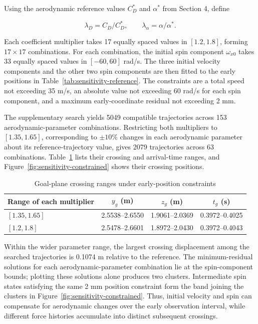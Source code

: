 \documentclass[12pt,letterpaper]{article}
\begin{document}
Using the aerodynamic reference values $C_D^*$ and $\alpha^*$ from Section 4, define


\begin{equation}
\lambda_D=C_D/C_D^*,\qquad
\lambda_\alpha=\alpha/\alpha^*.
\label{eq:sensitivity-coefficient-ratios}
\end{equation}

Each coefficient multiplier takes 17 equally spaced values in $[1.2,1.8]$, forming $17\times17$ combinations. For each combination, the initial spin component $\omega_{x0}$ takes 33 equally spaced values in $[-60,60]$ rad/s. The three initial velocity components and the other two spin components are then fitted to the early positions in Table~\ref{tab:sensitivity-reference}. The constraints are a total speed not exceeding 35 m/s, an absolute value not exceeding 60 rad/s for each spin component, and a maximum early-coordinate residual not exceeding 2 mm.


The supplementary search yields 5049 compatible trajectories across 153 aerodynamic-parameter combinations. Restricting both multipliers to $[1.35,1.65]$, corresponding to $\pm10\%$ changes in each aerodynamic parameter about its reference-trajectory value, gives 2079 trajectories across 63 combinations. Table~\ref{tab:sensitivity-profile} lists their crossing and arrival-time ranges, and Figure~\ref{fig:sensitivity-constrained} shows their crossing positions.


\begin{table}[H]
\centering
\small
\renewcommand{\arraystretch}{1.16}
\caption{Goal-plane crossing ranges under early-position constraints}
\begin{tabular}{lccc}
\toprule
Range of each multiplier & $y_g$ (m) & $z_g$ (m) & $t_g$ (s)\\
\midrule
$[1.35,1.65]$ & 2.5538--2.6550 & 1.9061--2.0369 & 0.3972--0.4025\\
$[1.2,1.8]$ & 2.5478--2.6601 & 1.8972--2.0430 & 0.3972--0.4043\\
\bottomrule
\end{tabular}
\label{tab:sensitivity-profile}
\end{table}


Within the wider parameter range, the largest crossing displacement among the searched trajectories is 0.1074 m relative to the reference. The minimum-residual solutions for each aerodynamic-parameter combination lie at the spin-component bounds; plotting these solutions alone produces two clusters. Intermediate spin states satisfying the same 2 mm position constraint form the band joining the clusters in Figure~\ref{fig:sensitivity-constrained}. Thus, initial velocity and spin can compensate for aerodynamic changes over the early observation interval, while different force histories accumulate into distinct subsequent crossings.
\end{document}
